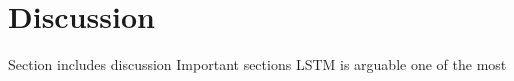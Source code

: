 \section{Discussion}
Section includes discussion
Important sections
LSTM is arguable one of the most 